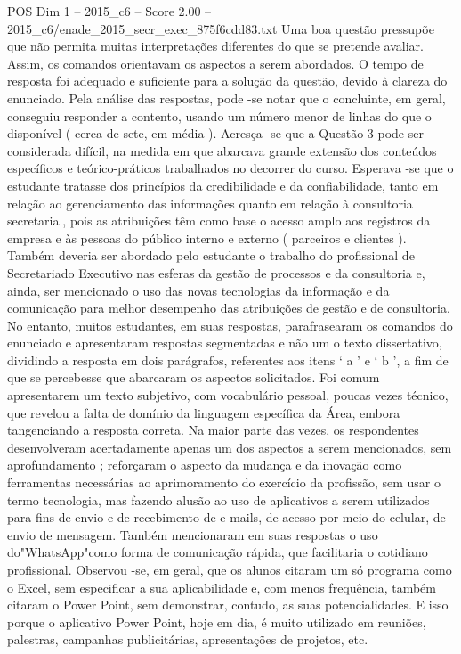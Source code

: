 \begin{textsample}{POS Dim 1 – 2015\_c6 – Score 2.00 – 2015\_c6/enade\_2015\_secr\_exec\_875f6cdd83.txt}
Uma boa questão pressupõe que não permita muitas interpretações diferentes do que se pretende avaliar.
Assim, os comandos orientavam os aspectos a serem abordados.
O tempo de resposta foi adequado e suficiente para a solução da questão, devido à clareza do enunciado.
Pela análise das respostas, pode -se notar que o concluinte, em geral, conseguiu responder a contento, usando um número menor de linhas do que o disponível ( cerca de sete, em média ).
Acresça -se que a Questão 3 pode ser considerada difícil, na medida em que abarcava grande extensão dos conteúdos específicos e teórico-práticos trabalhados no decorrer do curso.
Esperava -se que o estudante tratasse dos princípios da credibilidade e da confiabilidade, tanto em relação ao gerenciamento das informações quanto em relação à consultoria secretarial, pois as atribuições têm como base o acesso amplo aos registros da empresa e às pessoas do público interno e externo ( parceiros e clientes ).
Também deveria ser abordado pelo estudante o trabalho do profissional de Secretariado Executivo nas esferas da gestão de processos e da consultoria e, ainda, ser mencionado o uso das novas tecnologias da informação e da comunicação para melhor desempenho das atribuições de gestão e de consultoria.
No entanto, muitos estudantes, em suas respostas, parafrasearam os comandos do enunciado e apresentaram respostas segmentadas e não um o texto dissertativo, dividindo a resposta em dois parágrafos, referentes aos itens ‘ a ’ e ‘ b ’, a fim de que se percebesse que abarcaram os aspectos solicitados.
Foi comum apresentarem um texto subjetivo, com vocabulário pessoal, poucas vezes técnico, que revelou a falta de domínio da linguagem específica da Área, embora tangenciando a resposta correta.
Na maior parte das vezes, os respondentes desenvolveram acertadamente apenas um dos aspectos a serem mencionados, sem aprofundamento ; reforçaram o aspecto da mudança e da inovação como ferramentas necessárias ao aprimoramento do exercício da profissão, sem usar o termo tecnologia, mas fazendo alusão ao uso de aplicativos a serem utilizados para fins de envio e de recebimento de e-mails, de acesso por meio do celular, de envio de mensagem.
Também mencionaram em suas respostas o uso do"WhatsApp"como forma de comunicação rápida, que facilitaria o cotidiano profissional.
Observou -se, em geral, que os alunos citaram um só programa como o Excel, sem especificar a sua aplicabilidade e, com menos frequência, também citaram o Power Point, sem demonstrar, contudo, as suas potencialidades.
E isso porque o aplicativo Power Point, hoje em dia, é muito utilizado em reuniões, palestras, campanhas publicitárias, apresentações de projetos, etc.

\end{textsample}
